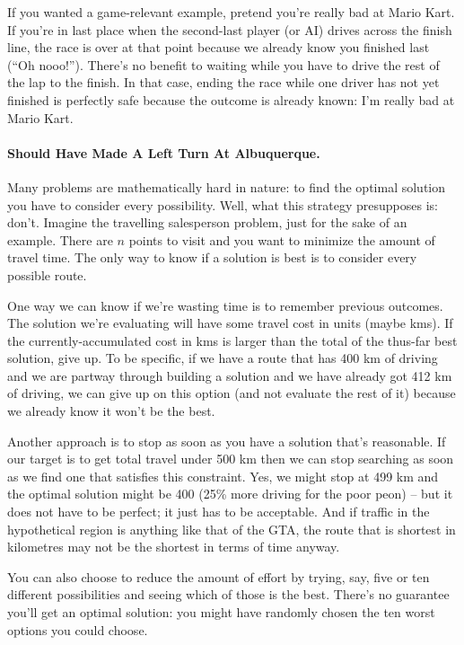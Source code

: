 \documentclass[a4paper]{report}
\begin{document}
If you wanted a game-relevant example, pretend you're really bad at Mario Kart. If you're in last place when the second-last player (or AI) drives across the finish line, the race is over at that point because we already know you finished last (``Oh nooo!''). There's no benefit to waiting while you have to drive the rest of the lap to the finish. In that case, ending the race while one driver has not yet finished is perfectly safe because the outcome is already known: I'm really bad at Mario Kart.

\paragraph{Should Have Made A Left Turn At Albuquerque.} 
Many problems are mathematically hard in nature: to find the optimal solution you have to consider every possibility. Well, what this strategy presupposes is: don't. Imagine the travelling salesperson problem, just for the sake of an example. There are $n$ points to visit and you want to minimize the amount of travel time. The only way to know if a solution is best is to consider every possible route.

One way we can know if we're wasting time is to remember previous outcomes. The solution we're evaluating will have some travel cost in units (maybe kms). If the currently-accumulated cost in kms is larger than the total of the thus-far best solution, give up. To be specific, if we have a route that has 400 km of driving and we are partway through building a solution and we have already got 412 km of driving, we can give up on this option (and not evaluate the rest of it) because we already know it won't be the best.

Another approach is to stop as soon as you have a solution that's reasonable. If our target is to get total travel under 500 km then we can stop searching as soon as we find one that satisfies this constraint. Yes, we might stop at 499 km and the optimal solution might be 400 (25\% more driving for the poor peon) -- but it does not have to be perfect; it just has to be acceptable. And if traffic in the hypothetical region is anything like that of the GTA, the route that is shortest in kilometres may not be the shortest in terms of time anyway.

You can also choose to reduce the amount of effort by trying, say, five or ten different possibilities and seeing which of those is the best. There's no guarantee you'll get an optimal solution: you might have randomly chosen the ten worst options you could choose. 
\end{document}

